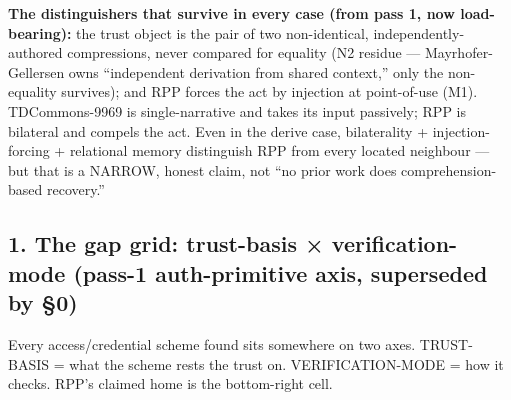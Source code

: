 \documentclass[
  11pt,
]{article}
\begin{document}
\textbf{The distinguishers that survive in every case (from pass 1, now
load-bearing):} the trust object is the pair of two non-identical,
independently-authored compressions, never compared for equality (N2
residue --- Mayrhofer-Gellersen owns ``independent derivation from
shared context,'' only the non-equality survives); and RPP forces the
act by injection at point-of-use (M1). TDCommons-9969 is
single-narrative and takes its input passively; RPP is bilateral and
compels the act. Even in the derive case, bilaterality +
injection-forcing + relational memory distinguish RPP from every located
neighbour --- but that is a NARROW, honest claim, not ``no prior work
does comprehension-based recovery.''

\subsection{1. The gap grid: trust-basis × verification-mode (pass-1
auth-primitive axis, superseded by
§0)}\label{the-gap-grid-trust-basis-verification-mode-pass-1-auth-primitive-axis-superseded-by-0}

Every access/credential scheme found sits somewhere on two axes.
TRUST-BASIS = what the scheme rests the trust on. VERIFICATION-MODE =
how it checks. RPP's claimed home is the bottom-right cell.
\end{document}
